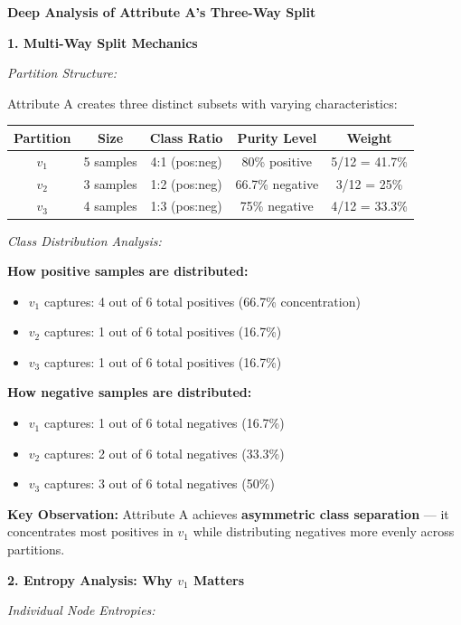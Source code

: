 \documentclass[12pt]{article}
\begin{document}
\begin{explanation}
\textbf{Deep Analysis of Attribute A's Three-Way Split}

\textbf{1. Multi-Way Split Mechanics}

\textit{Partition Structure:}

Attribute A creates three distinct subsets with varying characteristics:

\begin{center}
\begin{tabular}{|c|c|c|c|c|}
\hline
\textbf{Partition} & \textbf{Size} & \textbf{Class Ratio} & \textbf{Purity Level} & \textbf{Weight} \\
\hline
$v_1$ & 5 samples & 4:1 (pos:neg) & 80\% positive & 5/12 = 41.7\% \\
$v_2$ & 3 samples & 1:2 (pos:neg) & 66.7\% negative & 3/12 = 25\% \\
$v_3$ & 4 samples & 1:3 (pos:neg) & 75\% negative & 4/12 = 33.3\% \\
\hline
\end{tabular}
\end{center}

\textit{Class Distribution Analysis:}

\textbf{How positive samples are distributed:}
\begin{itemize}
    \item $v_1$ captures: 4 out of 6 total positives (66.7\% concentration)
    \item $v_2$ captures: 1 out of 6 total positives (16.7\%)
    \item $v_3$ captures: 1 out of 6 total positives (16.7\%)
\end{itemize}

\textbf{How negative samples are distributed:}
\begin{itemize}
    \item $v_1$ captures: 1 out of 6 total negatives (16.7\%)
    \item $v_2$ captures: 2 out of 6 total negatives (33.3\%)
    \item $v_3$ captures: 3 out of 6 total negatives (50\%)
\end{itemize}

\textbf{Key Observation:} Attribute A achieves \textbf{asymmetric class separation} — it concentrates most positives in $v_1$ while distributing negatives more evenly across partitions.

\textbf{2. Entropy Analysis: Why $v_1$ Matters}

\textit{Individual Node Entropies:}


\end{explanation}
\end{document}
